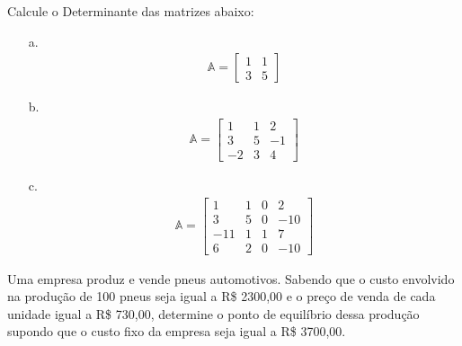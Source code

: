 \begin{exercise}
	Calcule o Determinante das matrizes abaixo:
	\begin{itemize}
		\item[a.]{
			\begin{align*}
			\mathbb{A}=\begin{bmatrix}1 & 1 \\ 3 & 5 \end{bmatrix}
			\end{align*}
			}
		\item[b.]{
			\begin{align*}
			\mathbb{A}=\begin{bmatrix}1 & 1 & 2 \\ 3 & 5 & -1 \\ -2 & 3 & 4 \end{bmatrix}
			\end{align*}
			}
		\item[c.]{
			\begin{align*}
			\mathbb{A}=\begin{bmatrix}1 & 1 & 0 & 2 \\ 3 & 5 & 0 & -10 \\ -11 & 1 & 1 & 7 \\ 6 & 2 & 0 & -10 \end{bmatrix}
			\end{align*}
			}
	\end{itemize}
\end{exercise}

\begin{exercise}
	Uma empresa produz e vende pneus automotivos. Sabendo que o custo envolvido na produção de 100 pneus seja igual a R\$ 2300,00 e o preço de venda de cada unidade igual a R\$ 730,00, determine o ponto de equilíbrio dessa produção supondo que o custo fixo da empresa seja igual a R\$ 3700,00.
\end{exercise}

